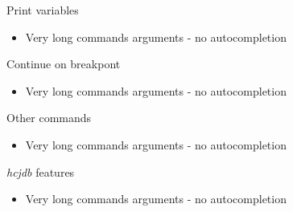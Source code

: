 \documentclass[utf8]{beamer}
\begin{document}
\begin{frame}{Print variables}	
	\begin{itemize}
		\item Very long commands arguments - no autocompletion
	\end{itemize}
\end{frame}

\begin{frame}{Continue on breakpont}	
	\begin{itemize}
		\item Very long commands arguments - no autocompletion
	\end{itemize}
\end{frame}

\begin{frame}{Other commands}	
	\begin{itemize}
		\item Very long commands arguments - no autocompletion
	\end{itemize}
\end{frame}

\begin{frame}{\emph{hcjdb} features}	
	\begin{itemize}
		\item Very long commands arguments - no autocompletion
	\end{itemize}
\end{frame}
\end{document}
